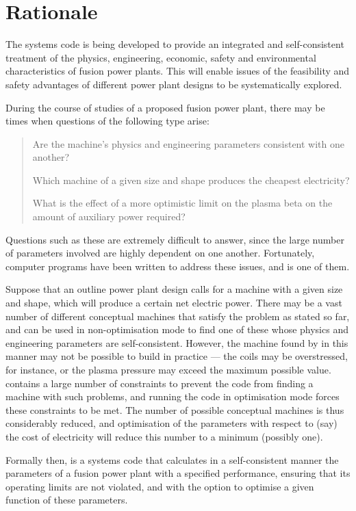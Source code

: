 \label{chap:intro}

\section{Rationale}

The \PS systems code is being developed to provide an integrated and
self-consistent treatment of the physics, engineering, economic, safety and
environmental characteristics of fusion power plants. This will enable issues
of the feasibility and safety advantages of different power plant designs to
be systematically explored.

During the course of studies of a proposed fusion power plant, there may be
times when questions of the following type arise:
\begin{quote}
Are the machine's physics and engineering parameters consistent with one
another?

Which machine of a given size and shape produces the cheapest electricity?

What is the effect of a more optimistic limit on the plasma beta on the amount
of auxiliary power required?
\end{quote}

Questions such as these are extremely difficult to answer, since the large
number of parameters involved are highly dependent on one another.
Fortunately, computer programs have been written to address these issues, and
\PS is one of them.

Suppose that an outline power plant design calls for a machine with a given
size and shape, which will produce a certain net electric power.  There may be
a vast number of different conceptual machines that satisfy the problem as
stated so far, and \PS can be used in non-optimisation mode to find one of
these whose physics and engineering parameters are self-consistent. However,
the machine found by \PS in this manner may not be possible to build in
practice --- the coils may be overstressed, for instance, or the plasma
pressure may exceed the maximum possible value. \PS contains a large number of
constraints to prevent the code from finding a machine with such problems, and
running the code in optimisation mode forces these constraints to be met. The
number of possible conceptual machines is thus considerably reduced, and
optimisation of the parameters with respect to (say) the cost of electricity
will reduce this number to a minimum (possibly one).

Formally then, \PS is a systems code that calculates in a self-consistent
manner the parameters of a fusion power plant with a specified performance,
ensuring that its operating limits are not violated, and with the option to
optimise a given function of these parameters.


